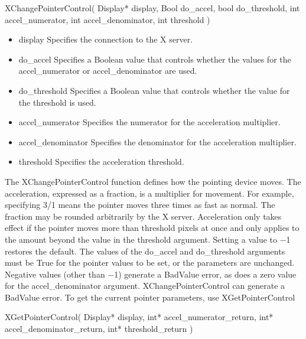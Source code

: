 \documentclass{report}
\begin{document}
\begin{itemize}
\begin{itemize}
\begin{cppcode}
            XChangePointerControl(
                Display* display,
                Bool do_accel,
                bool do_threshold,
                int accel_numerator,
                int accel_denominator,
                int threshold
            )
            \end{cppcode}
            \bigbreak \noindent
            \begin{itemize}
                \item display Specifies the connection to the X server.
                \item do\_accel Specifies a Boolean value that controls whether the values for the accel\_numerator or accel\_denominator are used.
                \item do\_threshold Specifies a Boolean value that controls whether the value for the threshold is used.
                \item accel\_numerator Specifies the numerator for the acceleration multiplier.
                \item accel\_denominator Specifies the denominator for the acceleration multiplier.
                \item threshold Specifies the acceleration threshold.
            \end{itemize}
            The XChangePointerControl function defines how the pointing device moves. The acceleration, expressed as a fraction, is a multiplier for movement. For example, specifying 3/1 means the pointer moves three times as fast as normal. The fraction may be rounded arbitrarily by the X server. Acceleration only takes effect if the pointer moves more than threshold pixels at once and only applies to the amount beyond the value in the threshold argument. Setting a value to −1 restores the default. The values of the do\_accel and do\_threshold arguments must be True for the pointer values to be set, or the parameters are unchanged. Negative values (other than −1) generate a BadValue error, as does a zero value for the accel\_denominator argument.
            \bigbreak \noindent 
            XChangePointerControl can generate a BadValue error.
            \bigbreak \noindent 
            To get the current pointer parameters, use XGetPointerControl
            \bigbreak \noindent 
            \begin{cppcode}
            XGetPointerControl(
                Display* display,
                int* accel_numerator_return,
                int* accel_denominator_return,
                int* threshold_return
            )

\end{cppcode}
\end{itemize}
\end{itemize}
\end{document}
